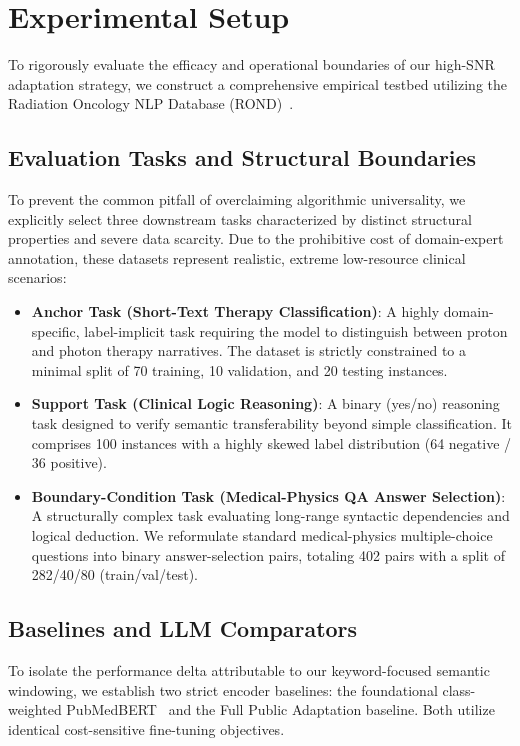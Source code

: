 \documentclass[a4paper,fleqn]{cas-dc}
\begin{document}
\section{Experimental Setup} \label{exp_setup}
To rigorously evaluate the efficacy and operational boundaries of our high-SNR adaptation strategy, we construct a comprehensive empirical testbed utilizing the Radiation Oncology NLP Database (ROND)~\cite{liu2024radiation}.

\subsection{Evaluation Tasks and Structural Boundaries}
To prevent the common pitfall of overclaiming algorithmic universality, we explicitly select three downstream tasks characterized by distinct structural properties and severe data scarcity. Due to the prohibitive cost of domain-expert annotation, these datasets represent realistic, extreme low-resource clinical scenarios:

\begin{itemize}
	\item \textbf{Anchor Task (Short-Text Therapy Classification)}: A highly domain-specific, label-implicit task requiring the model to distinguish between proton and photon therapy narratives. The dataset is strictly constrained to a minimal split of 70 training, 10 validation, and 20 testing instances.
	\item \textbf{Support Task (Clinical Logic Reasoning)}: A binary (yes/no) reasoning task designed to verify semantic transferability beyond simple classification. It comprises 100 instances with a highly skewed label distribution (64 negative / 36 positive).
	\item \textbf{Boundary-Condition Task (Medical-Physics QA Answer Selection)}: A structurally complex task evaluating long-range syntactic dependencies and logical deduction. We reformulate standard medical-physics multiple-choice questions into binary answer-selection pairs, totaling 402 pairs with a split of 282/40/80 (train/val/test).
\end{itemize}

\subsection{Baselines and LLM Comparators}
To isolate the performance delta attributable to our keyword-focused semantic windowing, we establish two strict encoder baselines: the foundational class-weighted PubMedBERT~\cite{gu2021domain} and the Full Public Adaptation baseline. Both utilize identical cost-sensitive fine-tuning objectives.
\end{document}
